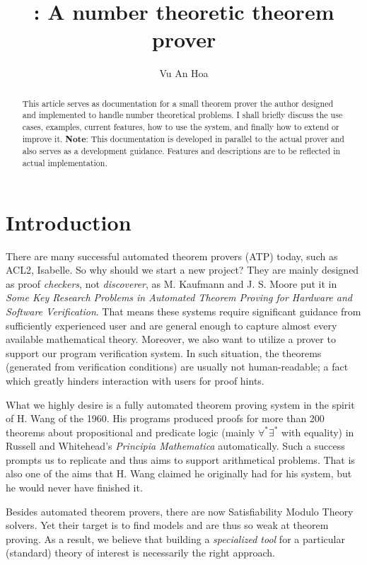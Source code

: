 \documentclass[12pt]{article}
\title{\zetatp: A number theoretic theorem prover}
\author{Vu An Hoa}
\begin{document}
\maketitle

\begin{abstract}
This article serves as documentation for a small theorem prover the author designed and implemented to handle number theoretical problems. I shall briefly discuss the use cases, examples, current features, how to use the system, and finally how to extend or improve it. {\bf Note}: This documentation is developed in parallel to the actual prover and also serves as a development guidance. Features and descriptions are to be reflected in actual implementation.
\end{abstract}

\section{Introduction}

There are many successful automated theorem provers (ATP) today, such as ACL2, Isabelle. So why should we start a new project? They are mainly designed as proof \emph{checkers}, not \emph{discoverer}, as M. Kaufmann and J. S. Moore put it in \emph{Some Key Research Problems in Automated Theorem Proving
for Hardware and Software Verification}. That means these systems require significant guidance from sufficiently experienced user and are general enough to capture almost every available mathematical theory. Moreover, we also want to utilize a prover to support our program verification system. In such situation, the theorems (generated from verification conditions) are usually not human-readable; a fact which greatly hinders interaction with users for proof hints.

What we highly desire is a fully automated theorem proving system in the spirit of H. Wang of the 1960. His programs produced  proofs for more than 200 theorems about propositional and predicate logic (mainly $\forall^{*}\exists^{*}$ with equality) in Russell and Whitehead's {\it Principia Mathematica} automatically. Such a success prompts us to replicate and thus aims to support arithmetical problems. That is also one of the aims that H. Wang claimed he originally had for his system, but he would never have finished it.

Besides automated theorem provers, there are now Satisfiability Modulo Theory solvers. Yet their target is to find models and are thus so weak at theorem proving. As a result, we believe that building a \emph{specialized tool} for a particular (standard) theory of interest is necessarily the right approach.
\end{document}
